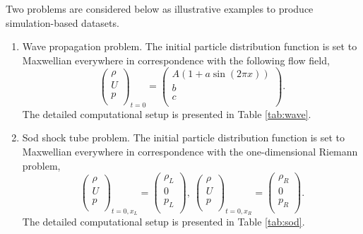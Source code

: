 \documentclass[preprint,3p,12pt,sort&compress]{elsarticle}
\begin{document}
Two problems are considered below as illustrative examples to produce simulation-based datasets.
\begin{enumerate}
    \item[(1)] Wave propagation problem. The initial particle distribution function is set to Maxwellian everywhere in correspondence with the following flow field,
    \begin{equation*}
        \left(\begin{array}{c}
        \rho \\
        U \\
        p \\
        \end{array}\right)_{{t=0}}=\left(\begin{array}{c}
        A(1+a \sin(2\pi x)) \\
        b \\
        c \\
        \end{array}\right).
    \end{equation*}
    The detailed computational setup is presented in Table \ref{tab:wave}.
    
    \item[(2)] Sod shock tube problem. The initial particle distribution function is set to Maxwellian everywhere in correspondence with the one-dimensional Riemann problem,
    \begin{equation*}
        \left(\begin{array}{c}
        \rho \\
        U \\
        p \\
        \end{array}\right)_{{t=0,x_L}}=\left(\begin{array}{c}
        \rho_L \\
        0 \\
        p_L \\
        \end{array}\right),\ 
        \left(\begin{array}{c}
        \rho \\
        U \\
        p \\
        \end{array}\right)_{{t=0,x_R}}=\left(\begin{array}{c}
        \rho_R \\
        0 \\
        p_R \\
        \end{array}\right).
    \end{equation*}
    The detailed computational setup is presented in Table \ref{tab:sod}.
\end{enumerate}
\end{document}
